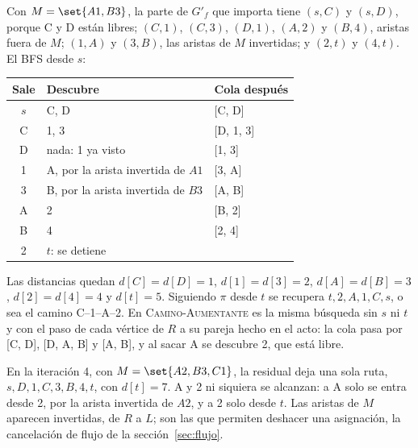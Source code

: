 \documentclass[11pt,letterpaper]{article}
\begin{document}
Con $M = \set{A1, B3}$, la parte de $G'_f$ que importa tiene $(s, C)$
y $(s, D)$, porque C y D están libres; $(C, 1)$, $(C, 3)$, $(D, 1)$,
$(A, 2)$ y $(B, 4)$, aristas fuera de $M$; $(1, A)$ y $(3, B)$, las
aristas de $M$ invertidas; y $(2, t)$ y $(4, t)$. El BFS desde $s$:
\begin{center}
\small
\begin{tabular}{cll}
  \toprule
  \textbf{Sale} & \textbf{Descubre} & \textbf{Cola después} \\
  \midrule
  $s$ & C, D & [C, D] \\
  C & 1, 3 & [D, 1, 3] \\
  D & nada: 1 ya visto & [1, 3] \\
  1 & A, por la arista invertida de $A1$ & [3, A] \\
  3 & B, por la arista invertida de $B3$ & [A, B] \\
  A & 2 & [B, 2] \\
  B & 4 & [2, 4] \\
  2 & $t$: se detiene & \\
  \bottomrule
\end{tabular}
\end{center}
Las distancias quedan $d[C] = d[D] = 1$, $d[1] = d[3] = 2$,
$d[A] = d[B] = 3$, $d[2] = d[4] = 4$ y $d[t] = 5$. Siguiendo $\pi$
desde $t$ se recupera $t, 2, A, 1, C, s$, o sea el camino
C--1--A--2. En \textsc{Camino-Aumentante} es la misma búsqueda sin
$s$ ni $t$ y con el paso de cada vértice de $R$ a su pareja hecho en
el acto: la cola pasa por [C, D], [D, A, B] y [A, B], y al sacar A se
descubre 2, que está libre.

En la iteración 4, con $M = \set{A2, B3, C1}$, la residual deja una
sola ruta, $s, D, 1, C, 3, B, 4, t$, con $d[t] = 7$. A y 2 ni
siquiera se alcanzan: a A solo se entra desde 2, por la arista
invertida de $A2$, y a 2 solo desde $t$. Las aristas de $M$ aparecen
invertidas, de $R$ a $L$; son las que permiten deshacer una
asignación, la cancelación de flujo de la sección~\ref{sec:flujo}.

\begin{center}
\end{center}
\end{document}

